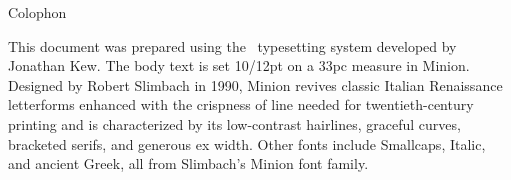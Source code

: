 \newpage
\onecolumn
\null \vfil
\pagestyle{empty}
\begin{center}
\begin{minipage}{2.9 in}
\begin{center}
  \bigskip
  \bigskip
  \bigskip
  \bigskip
  \bigskip
  \bigskip
    \huge Colophon
\end{center}
\begin{center}
  \medskip
\begin{singlespace}

\noindent This document was prepared using the \XeLaTeX~typesetting system developed by Jonathan Kew. The body text is set 10/12pt on a 33pc measure in Minion. Designed by Robert Slimbach in 1990, Minion revives classic Italian Renaissance letterforms enhanced with the crispness of line needed for twentieth-century printing and is characterized by its low-contrast hairlines, graceful curves, bracketed serifs, and generous ex width. Other fonts include Smallcaps, Italic, and ancient Greek, all from Slimbach’s Minion font family.\\

\end{singlespace}

\end{center}
\end{minipage}
\end{center}
\vfil
